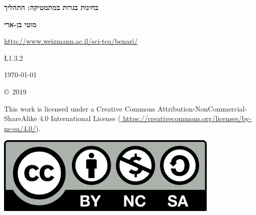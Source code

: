

\thispagestyle{empty}

\begin{center}
\textbf{\LARGE בחינות בגרות במתמטיקה: התהליך}
\end{center}

\bigskip
\bigskip

\begin{center}
\textbf{\Large מוטי בן-ארי}

\bigskip

\url{http://www.weizmann.ac.il/sci-tea/benari/}
\end{center}

\begin{center}	
\begin{bfseries}
\bigskip
\bigskip

 \L{1.3.2} 

\bigskip

\today

\end{bfseries}
\end{center}

\vfill


\begin{small}
\begin{center}
\copyright{}\ 2019 
\end{center}
This work is licensed under a Creative Commons Attribution-NonCommercial-ShareAlike 4.0 International License (\url{
https://creativecommons.org/licenses/by-nc-sa/4.0/}).
\end{small}

\bigskip

\begin{center}
\includegraphics[width=.3\textwidth]{../../by-nc-sa.png}
\end{center}

\np

\thispagestyle{empty}

\mbox{}

\np

\thispagestyle{empty}

\tableofcontents

